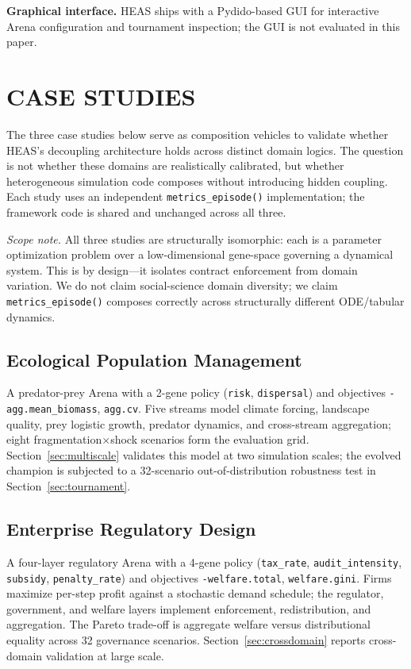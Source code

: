\documentclass{wscpaperproc}
\begin{document}
\textbf{Graphical interface.} HEAS ships with a Pydido-based GUI for
interactive Arena configuration and tournament inspection; the GUI is not
evaluated in this paper.

\section{CASE STUDIES}

The three case studies below serve as composition vehicles to validate whether HEAS's decoupling architecture holds across distinct domain logics. The question is not whether these domains are realistically calibrated, but whether heterogeneous simulation code composes without introducing hidden coupling. Each study uses an independent \texttt{metrics\_episode()} implementation; the framework code is shared and unchanged across all three.

\textit{Scope note.} All three studies are structurally isomorphic: each is a
parameter optimization problem over a low-dimensional gene-space governing a
dynamical system. This is by design---it isolates contract enforcement from
domain variation. We do not claim social-science domain diversity; we claim
\texttt{metrics\_episode()} composes correctly across structurally different
ODE/tabular dynamics.

\subsection{Ecological Population Management}

A predator-prey Arena with a 2-gene policy (\texttt{risk},
\texttt{dispersal}) and objectives \texttt{-agg.mean\_biomass},
\texttt{agg.cv}. Five streams model climate forcing, landscape quality, prey
logistic growth, predator dynamics, and cross-stream aggregation; eight
fragmentation$\times$shock scenarios form the evaluation grid.
Section~\ref{sec:multiscale} validates this model at two simulation scales; the evolved champion
is subjected to a 32-scenario out-of-distribution robustness test in
Section~\ref{sec:tournament}.

\subsection{Enterprise Regulatory Design}

A four-layer regulatory Arena with a 4-gene policy
(\texttt{tax\_rate}, \texttt{audit\_intensity}, \texttt{subsidy},
\texttt{penalty\_rate}) and objectives \texttt{-welfare.total},
\texttt{welfare.gini}. Firms maximize per-step profit against a stochastic
demand schedule; the regulator, government, and welfare layers implement
enforcement, redistribution, and aggregation. The Pareto trade-off is
aggregate welfare versus distributional equality across 32 governance scenarios.
Section~\ref{sec:crossdomain} reports cross-domain validation at large scale.
\end{document}
